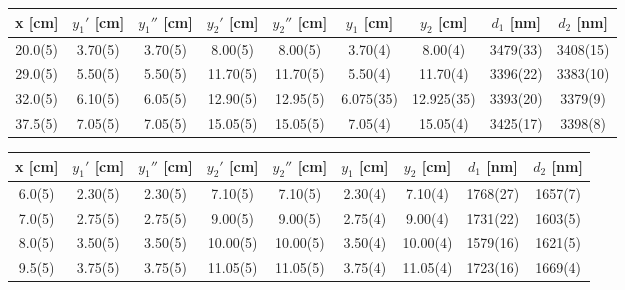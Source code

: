 \documentclass[a4paper,11pt]{article}
\begin{document}
                \begin{table}[t]   
                    \centering
                    \begin{tabular}{|c|c|c|c|c|c|c|c|c|}
                        \hline
                        x [cm] & $y_1'$ [cm] &  $y_1''$ [cm] & $y_2'$ [cm] & $y_2''$ [cm] & $y_1$ [cm] & $y_2$ [cm] & $d_1$ [nm] & $d_2$ [nm] \\
                        \hline
                        20.0(5) & 3.70(5) & 3.70(5) & 8.00(5) & 8.00(5) & 3.70(4) & 8.00(4) & 3479(33) & 3408(15) \\
                        \hline
                        29.0(5) & 5.50(5) & 5.50(5) & 11.70(5) & 11.70(5) & 5.50(4) & 11.70(4) & 3396(22) & 3383(10) \\
                        \hline
                        32.0(5) & 6.10(5) & 6.05(5) & 12.90(5) & 12.95(5) & 6.075(35) & 12.925(35) & 3393(20) & 3379(9) \\
                        \hline
                        37.5(5) & 7.05(5) & 7.05(5) & 15.05(5) & 15.05(5) & 7.05(4) & 15.05(4) & 3425(17) & 3398(8) \\
                        \hline
                    \end{tabular}
                    \captionsetup{justification=centering, font=footnotesize}
                    \vspace{10pt}              
                    \begin{tabular}{|c|c|c|c|c|c|c|c|c|}
                        \hline
                        x [cm] & $y_1'$ [cm] &  $y_1''$ [cm] & $y_2'$ [cm] & $y_2''$ [cm] & $y_1$ [cm] & $y_2$ [cm] & $d_1$ [nm] & $d_2$ [nm] \\
                        \hline
                        6.0(5) & 2.30(5) & 2.30(5) & 7.10(5) & 7.10(5) & 2.30(4) & 7.10(4) & 1768(27) & 1657(7) \\
                        \hline
                        7.0(5) & 2.75(5) & 2.75(5) & 9.00(5) & 9.00(5) & 2.75(4) & 9.00(4) & 1731(22) & 1603(5) \\
                        \hline
                        8.0(5) & 3.50(5) & 3.50(5) & 10.00(5) & 10.00(5) & 3.50(4) & 10.00(4) & 1579(16) & 1621(5) \\
                        \hline
                        9.5(5) & 3.75(5) & 3.75(5) & 11.05(5) & 11.05(5) & 3.75(4) & 11.05(4) & 1723(16) & 1669(4) \\
                        \hline
                    \end{tabular}
                    \captionsetup{justification=centering, font=footnotesize}
                    \vspace{10pt}
                \end{table}
\end{document}
